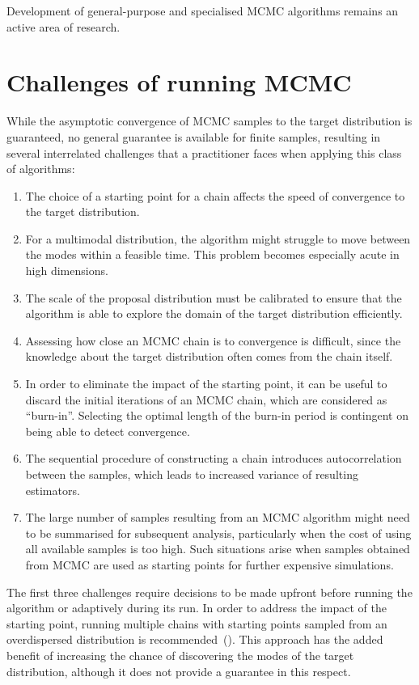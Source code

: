 \documentclass[11pt,a4paper]{report}
\begin{document}

Development of general-purpose and specialised MCMC algorithms remains an active area of research.

\section{Challenges of running MCMC}

While the asymptotic convergence of MCMC samples to the target distribution is guaranteed, no general guarantee is available for finite samples, resulting in several interrelated challenges that a practitioner faces when applying this class of algorithms:
\begin{enumerate}
\item The choice of a starting point for a chain affects the speed of convergence to the target distribution.
\item For a multimodal distribution, the algorithm might struggle to move between the modes within a feasible time. This problem becomes especially acute in high dimensions.
\item The scale of the proposal distribution must be calibrated to ensure that the algorithm is able to explore the domain of the target distribution efficiently.
\item Assessing how close an MCMC chain is to convergence is difficult, since the knowledge about the target distribution often comes from the chain itself.
\item In order to eliminate the impact of the starting point, it can be useful to discard the initial iterations of an MCMC chain, which are considered as ``burn-in''. Selecting the optimal length of the burn-in period is contingent on being able to detect convergence.
\item The sequential procedure of constructing a chain introduces autocorrelation between the samples, which leads to increased variance of resulting estimators.
\item The large number of samples resulting from an MCMC algorithm might need to be summarised for subsequent analysis, particularly when the cost of using all available samples is too high. Such situations arise when samples obtained from MCMC are used as starting points for further expensive simulations.
\end{enumerate}

The first three challenges require decisions to be made upfront before running the algorithm or adaptively during its run. In order to address the impact of the starting point, running multiple chains with starting points sampled from an overdispersed distribution is recommended~(\cite{gelmanInferenceIterativeSimulation1992}). This approach has the added benefit of increasing the chance of discovering the modes of the target distribution, although it does not provide a guarantee in this respect. 
\end{document}
